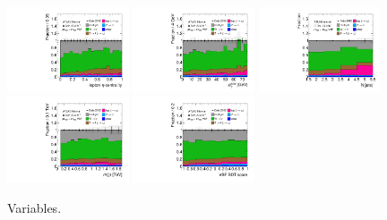 \begin{figure}[tp]
  \includegraphics[width=0.32\textwidth]{figures/rx/vbf-mvaSR/lep-eta-centrality}
  \includegraphics[width=0.32\textwidth]{figures/rx/vbf-mvaSR/system-pt}
  \includegraphics[width=0.32\textwidth]{figures/rx/vbf-mvaSR/n-jets30}
  \includegraphics[width=0.32\textwidth]{figures/rx/vbf-mvaSR/dijet-m-veryhigh}
  \includegraphics[width=0.32\textwidth]{figures/rx/vbf-mvaSR/BDTEve-VBF}
  \caption{Variables.}
  \label{fig:backgrounds-rx-vbf-jets}
\end{figure}

